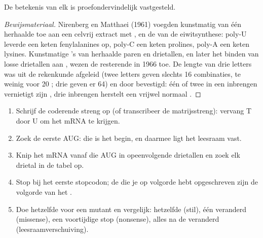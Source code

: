 \begin{proposition}\label{prop:g11:gene-expression:readcode}
De betekenis van elk  is proefondervindelijk vastgesteld.
\end{proposition}
\begin{proof}[Bewijsmateriaal]
Nirenberg en Matthaei (1961) voegden kunstmatig  van één herhaalde
 toe aan een celvrij extract met ,  en de
 van de eiwitsynthese: poly-U leverde een keten fenylalanines op,
poly-C een keten prolines, poly-A een keten lysines. Kunstmatige 's
van herhaalde paren en drietallen, en later het binden van losse
drietallen aan , wezen de resterende  in 1966 toe. De
lengte van drie letters was uit de rekenkunde afgeleid (twee letters
geven slechts 16 combinaties, te weinig voor 20 ; drie geven er
64) en door  bevestigd: één of twee  in een 
inbrengen vernietigt zijn , drie inbrengen herstelt een vrijwel
normaal .
\end{proof}

\begin{method}\label{met:g11:gene-expression:translate}
\begin{enumerate}
  \item Schrijf de coderende streng op (of transcribeer de
        matrijsstreng): vervang T door U om het mRNA te krijgen.
  \item Zoek de eerste AUG: die is het begin, en daarmee ligt het
        leesraam vast.
  \item Knip het mRNA vanaf die AUG in opeenvolgende drietallen en zoek
        elk drietal in de tabel op.
  \item Stop bij het eerste stopcodon; de  die je op volgorde
        hebt opgeschreven zijn de volgorde van het .
  \item Doe hetzelfde voor een mutant en vergelijk: hetzelfde 
        (stil), één  veranderd (missense), een voortijdige stop
        (nonsense), alles na de  veranderd (leesraamverschuiving).
\end{enumerate}
\end{method}

